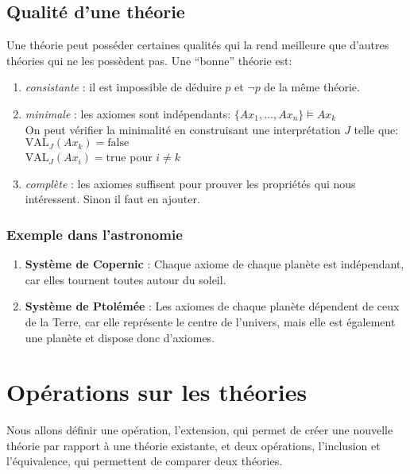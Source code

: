 {\subsection{Qualité d'une théorie}

Une théorie peut posséder certaines qualités qui la rend
meilleure que d'autres théories qui ne les possèdent pas.
Une ``bonne'' théorie est:
\begin {enumerate}
\item {\em consistante} : il est impossible de déduire \(p\) et \(\neg p\)  de la même théorie.
\item {\em minimale} : les axiomes sont indépendants: $\{Ax_1, \hdots, Ax_n\} \models Ax_k $\\
On peut vérifier la minimalité en construisant une interprétation $J$ telle que:\\
$\text{VAL}_J (Ax_k)= \mathrm{false}$\\
$\text{VAL}_J (Ax_i)= \mathrm{true}$ pour $i \neq k$
\item {\em complète} : les axiomes suffisent pour prouver les propriétés qui nous intéressent. Sinon il faut en ajouter.
\end {enumerate}

\subsubsection{Exemple dans l'astronomie}
\begin {enumerate}
\item {\textbf{Système de Copernic}} : Chaque axiome de chaque planète est indépendant, car elles tournent toutes autour du soleil.
\item{\textbf{Système de Ptolémée}} : Les axiomes de chaque planète dépendent de ceux de la Terre, car elle représente le centre de l'univers, mais elle est également une planète et dispose donc d'axiomes.
\end {enumerate}


\section{Opérations sur les théories}

Nous allons définir une opération, l'extension, qui permet de créer une nouvelle théorie par rapport à une théorie existante,
et deux opérations, l'inclusion et l'équivalence, qui permettent de comparer deux théories.

}
